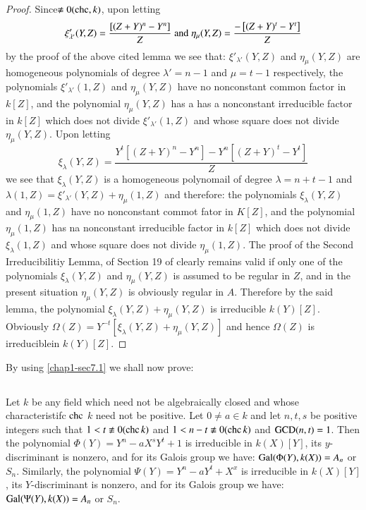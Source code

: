 \begin{proof}
Since\pageoriginale $\nequiv 0(\chc, k)$, upon letting
$$
\xi'_{\lambda'}(Y,Z)=\dfrac{\left[(Z+Y)^n-Y^{n}\right]}{Z} \; {\rm and}\; \eta_{\mu}(Y,Z)=\dfrac{-\left[(Z+Y)^t-Y^{t}\right]}{Z}
$$
by the proof of the above cited lemma we see that: $\xi'_{\lambda'}(Y,Z)$ and $\eta_{\mu}(Y,Z)$ are homogeneous polynomials of degree $\lambda'=n-1$ and $\mu = t-1$ respectively, the polynomials $\xi'_{\lambda'}(1,Z)$ and $\eta_{\mu}(Y,Z)$ have no nonconstant common factor in $k[Z]$, and the polynomial $\eta_{\mu}(Y,Z)$ has a has a nonconstant irreducible factor in $k[Z]$ which does not divide $\xi'_{\lambda'}(1,Z)$ and whose square does not divide $\eta_{\mu}(Y,Z)$. Upon letting 
$$
\xi_{\lambda}(Y,Z)=\dfrac{Y^{t}\left[(Z+Y)^{n}-Y^{n}\right]-Y^{n}\left[(Z+Y)^{t}-Y^{t}\right]}{Z}
$$
we see that $\xi_{\lambda}(Y,Z)$ is a homogeneous polynomail of degree $\lambda =n+t-1$ and $\lambda(1,Z)= \xi'_{\lambda'}(Y,Z)+\eta_{\mu}(1,Z)$ and therefore: the polynomials $\xi_{\lambda}(Y,Z)$ and $\eta_{\mu}(1,Z)$ have no  nonconstant commot fator in $K[Z]$, and the polynomial $\eta_{\mu}(1,Z)$ has na nonconstant irreducible factor in $k[Z]$ which does not divide $\xi_{\lambda}(1,Z)$ and whose square does not divide $\eta_{\mu}(1,Z)$. The proof of the Second Irreducibilitiy Lemma, of Section 19 of \cite{chap1-key8} clearly remains valid if only one of the polynomials $\xi_{\lambda}(Y,Z)$ and $\eta_{\mu}(Y,Z)$ is assumed to be regular in $Z$, and in the present situation $\eta_{\mu}(Y,Z)$ is obviously regular in $A$. Therefore by the said lemma, the polynomial $\xi_{\lambda}(Y,Z) + \eta_{\mu}(Y,Z)$  is irreducible $k(Y)[Z]$. Obviously $\Omega(Z)=Y^{-t}\left[\xi_{\lambda}(Y,Z) + \eta_{\mu}(Y,Z)\right]$ and hence $\Omega(Z)$ is irreducible\break in $k(Y)[Z]$.
\end{proof}
By using \eqref{chap1-sec7.1} we shall now prove:

\subsection{}\label{chap1-sec7.2}
Let $k$ be any field which need not be algebraically closed and whose characteristifc $\operatorname{chc}$ $k$  need not be positive. Let $0 \neq a\in k$ and let $n, t, s$ be positive integers such that $1 < t\nequiv 0(\chc k)$ and $1 < n-t \nequiv 0(\chc k)$ and $\operatorname{GCD}(n, t) =1$. Then the polynomial $\Phi(Y)=Y^{n}-aX^{s}Y^{t}+1$ is irreducible in $k(X)[Y]$, its $y$-discriminant is nonzero, and for its Galois group we have: $\operatorname{Gal}(\Phi(Y), k(X))=A_{n}$ or $S_{n}$. Similarly, the polynomial $\Psi(Y)=Y^{n}-aY^{t}+X^{x}$ is irreducible in $k(X)[Y]$, its $Y$-discriminant is nonzero, and for its Galois group we have: $\operatorname{Gal}(\Psi(Y), k(X))=A_{n}$ or $S_{n}$.

